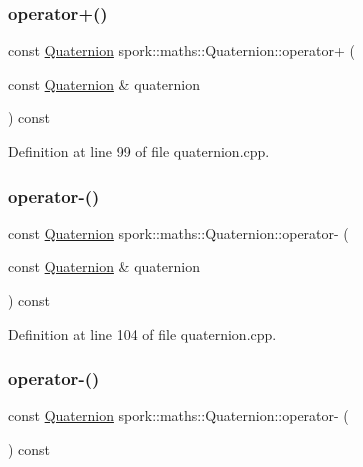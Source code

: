 \subsubsection{\texorpdfstring{operator+()}{operator+()}}
{\footnotesize\ttfamily const \hyperlink{structspork_1_1maths_1_1_quaternion}{Quaternion} spork\+::maths\+::\+Quaternion\+::operator+ (\begin{DoxyParamCaption}\item[{const \hyperlink{structspork_1_1maths_1_1_quaternion}{Quaternion} \&}]{quaternion }\end{DoxyParamCaption}) const}



Definition at line 99 of file quaternion.\+cpp.

\mbox{\label{structspork_1_1maths_1_1_quaternion_af1c9b5ef7b54ca9de3f0b1e1b4b2894b}} 
\subsubsection{\texorpdfstring{operator-\/()}{operator-()}\hspace{0.1cm}{\footnotesize\ttfamily [1/2]}}
{\footnotesize\ttfamily const \hyperlink{structspork_1_1maths_1_1_quaternion}{Quaternion} spork\+::maths\+::\+Quaternion\+::operator-\/ (\begin{DoxyParamCaption}\item[{const \hyperlink{structspork_1_1maths_1_1_quaternion}{Quaternion} \&}]{quaternion }\end{DoxyParamCaption}) const}



Definition at line 104 of file quaternion.\+cpp.

\mbox{\label{structspork_1_1maths_1_1_quaternion_abcba9ae87308fe8796c6d720a2f087d4}} 
\subsubsection{\texorpdfstring{operator-\/()}{operator-()}\hspace{0.1cm}{\footnotesize\ttfamily [2/2]}}
{\footnotesize\ttfamily const \hyperlink{structspork_1_1maths_1_1_quaternion}{Quaternion} spork\+::maths\+::\+Quaternion\+::operator-\/ (\begin{DoxyParamCaption}{ }\end{DoxyParamCaption}) const}



